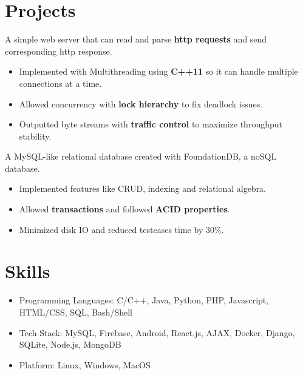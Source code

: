 \documentclass{resume}
\begin{document}
\section{Projects}

  A simple web server that can read and parse \textbf{http requests} and send corresponding http response.
\begin{itemize}
  \item Implemented with Multithreading using \textbf{C++11} so it can handle multiple connections at a time.
  \item Allowed concurrency with \textbf{lock hierarchy} to fix deadlock issues.
  \item Outputted byte streams with \textbf{traffic control} to maximize throughput stability.
\end{itemize}

  A MySQL-like relational database created with FoundationDB, a noSQL database.
\begin{itemize}
  \item Implemented features like CRUD, indexing and relational algebra.
  \item Allowed \textbf{transactions} and followed \textbf{ACID properties}.
  \item Minimized disk IO and reduced testcases time by 30\%.
\end{itemize}

\section{Skills}
\begin{itemize}[parsep=0.5ex]
  \item Programming Languages: C/C++, Java, Python, PHP, Javascript, HTML/CSS, SQL, Bash/Shell
  \item Tech Stack: MySQL, Firebase, Android, React.js, AJAX, Docker, Django, SQLite, Node.js, MongoDB
  \item Platform: Linux, Windows, MacOS
\end{itemize}
\end{document}
